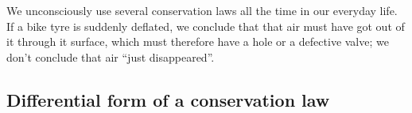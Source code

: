 \documentclass[a4paper,12pt,%
onecolumn,oneside,titlepage,%
british%
]{memoir}
\newcommand{\mynotew}[1]{{\footnotesize\color{midgrey}\faIcon{tools}\ #1}}
\renewcommand*{\|}[1][]{\nonscript\:#1\vert\nonscript\:\mathopen{}}
\newcommand*{\yN}{N}
\newcommand*{\yJ}{J}
\begin{document}
We unconsciously use
%
several conservation laws all the time in our everyday life. If a bike tyre is suddenly deflated, we conclude that that air must have got out of it through it surface, which must therefore have a hole or a defective valve; we don't conclude that air \enquote{just disappeared}.



\subsection{Differential form of a conservation law}
\label{sec:conservation_laws_diff}
\end{document}
